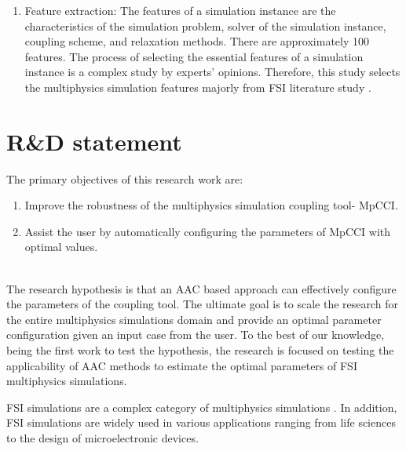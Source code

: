 \begin{enumerate}
\item Feature extraction: The features of a simulation instance are the characteristics of the simulation problem, solver of the simulation instance, coupling scheme, and relaxation methods. There are approximately 100 features. The process of selecting the essential features of a simulation instance is a complex study by experts' opinions. Therefore, this study selects the multiphysics simulation features majorly from FSI literature study \cite{FSI_properties} \cite{FSI_properties2}. 

\end{enumerate}

\section{R\&D statement}
The primary objectives of this research work are:
\begin{enumerate}
\item Improve the robustness of the multiphysics simulation coupling tool- MpCCI.
\item Assist the user by automatically configuring the parameters of MpCCI with optimal values.
\end{enumerate}

\\

The research hypothesis is that an AAC based approach can effectively configure the parameters of the coupling tool. The ultimate goal is to scale the research for the entire multiphysics simulations domain and provide an optimal parameter configuration given an input case from the user. To the best of our knowledge, being the first work to test the hypothesis, the research is focused on testing the applicability of AAC methods to estimate the optimal parameters of FSI multiphysics simulations.

FSI simulations are a complex category of multiphysics simulations \cite{FSI_Bungartz}. In addition, FSI simulations are widely used in various applications ranging from life sciences to the design of microelectronic devices. 


